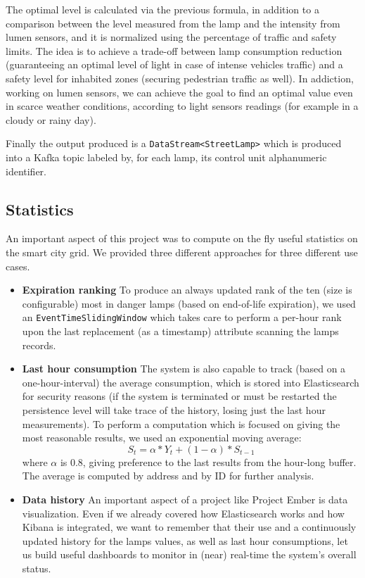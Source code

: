 	The optimal level is calculated via the previous formula, in addition to a comparison between the level measured from the lamp and the intensity from lumen sensors, and it is normalized using the percentage of traffic and safety limits. The idea is to achieve a trade-off between lamp consumption reduction (guaranteeing an optimal level of light in case of intense vehicles traffic) and a safety level for inhabited zones (securing pedestrian traffic as well). In addiction, working on lumen sensors, we can achieve the goal to find an optimal value even in scarce weather conditions, according to light sensors readings (for example in a cloudy or rainy day).

Finally the output produced is a \texttt{DataStream<StreetLamp>} which is produced into a Kafka topic labeled by, for each lamp, its control unit alphanumeric identifier.

\subsection*{Statistics}
An important aspect of this project was to compute on the fly useful statistics on the smart city grid. We provided three different approaches for three different use cases.
\begin{itemize}
	\item \textbf{Expiration ranking} To produce an always updated rank of the ten (size is configurable) most in danger lamps (based on end-of-life expiration), we used an \texttt{EventTimeSlidingWindow} which takes care to perform a per-hour rank upon the last replacement (as a timestamp) attribute scanning the lamps records.
	\item \textbf{Last hour consumption} The system is also capable to track (based on a one-hour-interval) the average consumption, which is stored into Elasticsearch for security reasons (if the system is terminated or must be restarted the persistence level will take trace of the history, losing just the last hour measurements). To perform a computation which is focused on giving the most reasonable results, we used an exponential moving average:
$$S_t = \alpha*Y_t + (1 - \alpha)*S_{t-1}$$
where $\alpha$ is 0.8, giving preference to the last results from the hour-long buffer. The average is computed by address and by ID for further analysis.
	\item \textbf{Data history} An important aspect of a project like Project Ember is data visualization. Even if we already covered how Elasticsearch works and how Kibana is integrated, we want to remember that their use and a continuously updated history for the lamps values, as well as last hour consumptions, let us build useful dashboards to monitor in (near) real-time the system's overall status.
\end{itemize}


